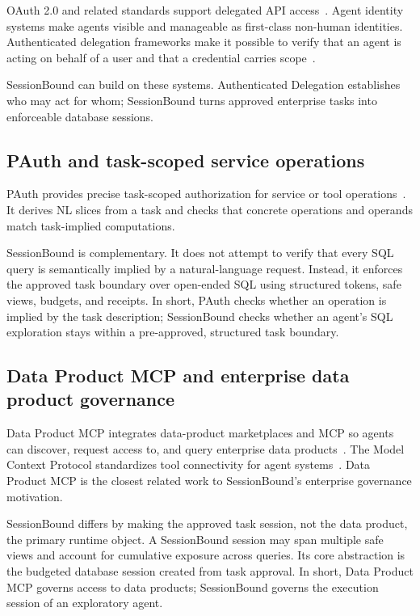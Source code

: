 \documentclass[
]{article}
\begin{document}
OAuth 2.0 and related standards support delegated API
access~\cite{rfc6749}. Agent identity systems make agents visible and
manageable as first-class non-human identities. Authenticated delegation
frameworks make it possible to verify that an agent is acting on behalf
of a user and that a credential carries
scope~\cite{south2025authenticateddelegation}.

SessionBound can build on these systems. Authenticated Delegation
establishes who may act for whom; SessionBound turns approved enterprise
tasks into enforceable database sessions.

\hypertarget{pauth-and-task-scoped-service-operations}{%
\subsection{PAuth and task-scoped service
operations}\label{pauth-and-task-scoped-service-operations}}

PAuth provides precise task-scoped authorization for service or tool
operations~\cite{sharma2026pauth}. It derives NL slices from a task and
checks that concrete operations and operands match task-implied
computations.

SessionBound is complementary. It does not attempt to verify that every
SQL query is semantically implied by a natural-language request.
Instead, it enforces the approved task boundary over open-ended SQL
using structured tokens, safe views, budgets, and receipts. In short,
PAuth checks whether an operation is implied by the task description;
SessionBound checks whether an agent's SQL exploration stays within a
pre-approved, structured task boundary.

\hypertarget{data-product-mcp-and-enterprise-data-product-governance}{%
\subsection{Data Product MCP and enterprise data product
governance}\label{data-product-mcp-and-enterprise-data-product-governance}}

Data Product MCP integrates data-product marketplaces and MCP so agents
can discover, request access to, and query enterprise data
products~\cite{tonnarelli2026dataproductmcp}. The Model Context
Protocol standardizes tool connectivity for agent
systems~\cite{mcp2025specification}. Data Product MCP is the closest
related work to SessionBound's enterprise governance motivation.

SessionBound differs by making the approved task session, not the data
product, the primary runtime object. A SessionBound session may span
multiple safe views and account for cumulative exposure across queries.
Its core abstraction is the budgeted database session created from task
approval. In short, Data Product MCP governs access to data products;
SessionBound governs the execution session of an exploratory agent.
\end{document}
